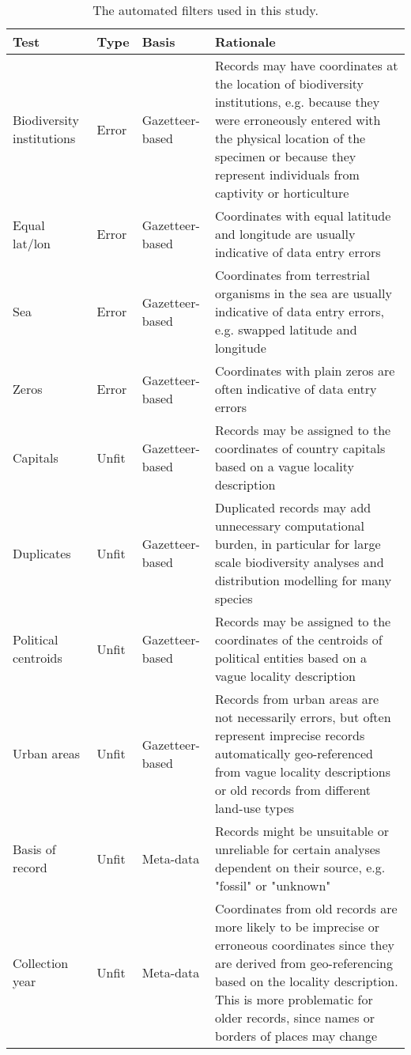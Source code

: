 \documentclass[fleqn,10pt,lineno]{wlpeerj} %
\begin{document}
\begin{table}[!h]

\caption{\label{tab:tabletests}The automated filters used in this study.}
\centering
\fontsize{9}{11}\selectfont
\begin{tabular}[t]{>{\raggedright\arraybackslash}p{2cm}>{\raggedright\arraybackslash}p{1cm}>{\raggedright\arraybackslash}p{2.5cm}>{\raggedright\arraybackslash}p{9cm}}
\toprule
Test & Type & Basis & Rationale\\
\midrule
\rowcolor{gray!6}  Biodiversity institutions & Error & Gazetteer-based & Records may have coordinates at the location of biodiversity institutions, e.g. because they were erroneously entered with the physical location of the specimen or because they represent individuals from captivity or horticulture\\
Equal lat/lon & Error & Gazetteer-based & Coordinates with equal latitude and longitude are usually indicative of data entry errors\\
\rowcolor{gray!6}  Sea & Error & Gazetteer-based & Coordinates from terrestrial organisms in the sea are usually indicative of data entry errors, e.g. swapped latitude and longitude\\
Zeros & Error & Gazetteer-based & Coordinates with plain zeros are often indicative of data entry errors\\
\rowcolor{gray!6}  Capitals & Unfit & Gazetteer-based & Records may be assigned to the coordinates of country capitals based on a vague locality description\\
\addlinespace
Duplicates & Unfit & Gazetteer-based & Duplicated records may add unnecessary computational burden, in particular for large scale biodiversity analyses and distribution modelling for many species\\
\rowcolor{gray!6}  Political centroids & Unfit & Gazetteer-based & Records may be assigned to the coordinates of the centroids of political entities based on a vague locality description\\
Urban areas & Unfit & Gazetteer-based & Records from urban areas are not necessarily errors, but often represent imprecise records automatically geo-referenced from vague locality descriptions or old records from different land-use types\\
\rowcolor{gray!6}  Basis of record & Unfit & Meta-data & Records might be unsuitable or unreliable for certain analyses dependent on their source, e.g. "fossil" or "unknown"\\
Collection year & Unfit & Meta-data & Coordinates from old records are more likely to be imprecise or erroneous coordinates since they are derived from  geo-referencing based on the locality description. This is more problematic for older records, since names or borders of places may change\\

\end{tabular}
\end{table}
\end{document}
